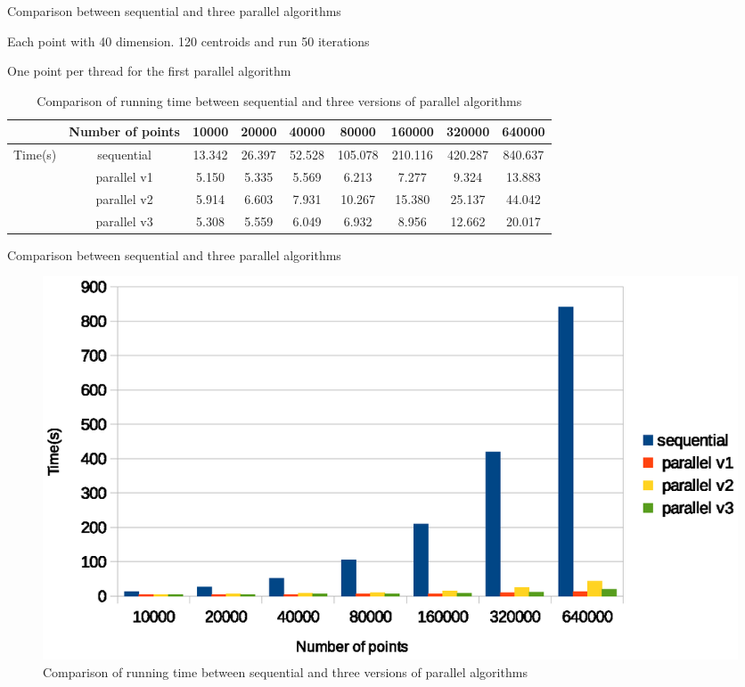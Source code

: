 \documentclass[
nopagebreaks,
style=klope,
fleqn]{powerdot}
\begin{document}
\begin{slide}{Comparison between sequential and three parallel algorithms}
  \begin{compactitem}
  \item{Each point with 40 dimension. 120 centroids and run 50 iterations}
  \item{One point per thread for the first parallel algorithm}
  \end{compactitem}
  \tiny
  \begin{table}[!h]
  \centering
  \begin{tabular}{|c|c|c|c|c|c|c|c|c|}
    \hline
    {}& Number of points	& 10000	& 20000	& 40000	& 80000	& 160000	& 320000	& 640000 \\
    \hline
    \multirow{4}{*}{Time(s)}	& sequential	& 13.342	& 26.397	& 52.528	& 105.078	& 210.116	& 420.287	& 840.637 \\
    \cline{2-9}
	  & parallel v1	& 5.150	& 5.335	& 5.569	& 6.213	& 7.277	& 9.324	& 13.883 \\
    \cline{2-9}
	  & parallel v2	& 5.914	& 6.603	& 7.931	& 10.267	& 15.380	& 25.137	& 44.042 \\
    \cline{2-9}
	  & parallel v3	& 5.308	& 5.559	& 6.049	& 6.932	& 8.956	& 12.662	& 20.017 \\
    \hline
  \end{tabular}
  \label{tab:comparison}
  \caption{Comparison of running time between sequential and three versions of parallel algorithms}
\end{table}
\end{slide}

\begin{slide}{Comparison between sequential and three parallel algorithms}
  \begin{figure}[!h]
    \centering
    \includegraphics[width=\linewidth]{fig/all_comparison}
    \caption{Comparison of running time between sequential and three versions of parallel algorithms}
    \label{fig:all}
  \end{figure}
\end{slide}
\end{document}
